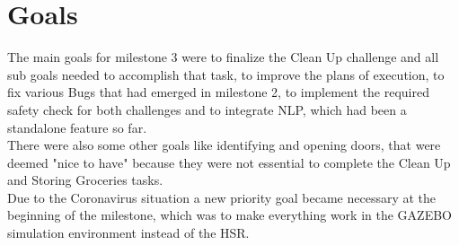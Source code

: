 \documentclass[main.tex]{subfiles}
\begin{document}
	
	\chapter{Goals}
The main goals for milestone 3 were to finalize the Clean Up challenge and all sub goals needed to accomplish that task, to improve the plans of execution, to fix various Bugs that had emerged in milestone 2, to implement the required safety check for both challenges and to integrate NLP, which had been a standalone feature so far.\\
There were also some other goals like identifying and opening doors, that were deemed "nice to have" because they were not essential to complete the Clean Up and Storing Groceries tasks.\\
Due to the Coronavirus situation a new priority goal became necessary at the beginning of the milestone, which was to make everything work in the GAZEBO simulation environment instead of the HSR.
	
\end{document}
